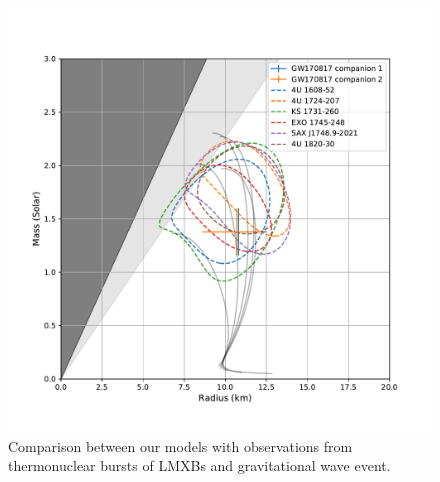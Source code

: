 \documentclass[hperref={pdfpagelabels=false}]{beamer}
\begin{document}
\begin{frame}
\begin{columns}
\begin{column}{0.48\textwidth}
\begin{figure}
    \includegraphics[scale=0.3]{eos_compare_obsv2_GW.pdf}
    \caption{Comparison between our models with observations from thermonuclear bursts of LMXBs and gravitational wave event.}
  \end{figure}
  \end{column}
 \end{columns}
\end{frame}
\end{document}
